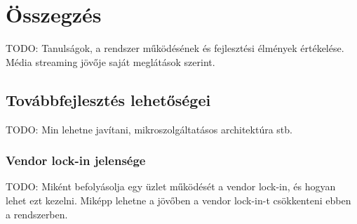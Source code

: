 \chapter{Összegzés}

TODO: Tanulságok, a rendszer működésének és fejlesztési élmények értékelése. Média streaming jövője saját meglátások szerint.

\section{Továbbfejlesztés lehetőségei}

TODO: Min lehetne javítani, mikroszolgáltatásos architektúra stb.

\subsection{Vendor lock-in jelensége}

TODO: Miként befolyásolja egy üzlet működését a vendor lock-in, és hogyan lehet ezt kezelni. Miképp lehetne a jövőben a vendor lock-in-t csökkenteni ebben a rendszerben.
